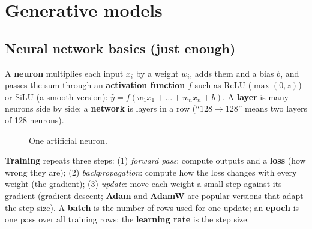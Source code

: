 \chapter{Generative models}
\label{ch:gen}

\section{Neural network basics (just enough)}
A \textbf{neuron} multiplies each input $x_i$ by a weight $w_i$, adds them and a bias $b$, and passes the sum through
an \textbf{activation function} $f$ such as ReLU ($\max(0,z)$) or SiLU (a smooth version):
$\hat y=f(w_1x_1+\dots+w_nx_n+b)$. A \textbf{layer} is many neurons side by side; a \textbf{network} is layers in a row
(``$128\to128$'' means two layers of 128 neurons).

\begin{figure}[H]
\centering
{}
\caption{One artificial neuron.}
\end{figure}

\textbf{Training} repeats three steps: (1) \emph{forward pass}: compute outputs and a \textbf{loss} (how wrong they
are); (2) \emph{backpropagation}: compute how the loss changes with every weight (the gradient); (3) \emph{update}: move
each weight a small step against its gradient (gradient descent; \textbf{Adam} and \textbf{AdamW} are popular versions
that adapt the step size). A \textbf{batch} is the number of rows used for one update; an \textbf{epoch} is one pass
over all training rows; the \textbf{learning rate} is the step size.

